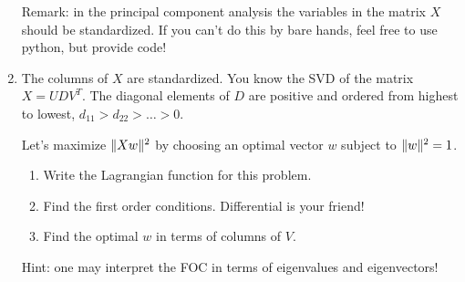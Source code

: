 \documentclass[12pt]{article}
\DeclarePairedDelimiter{\norm}{\lVert}{\rVert}
\begin{document}
\begin{enumerate}
    Remark: in the principal component analysis the variables in the matrix $X$ should be standardized.
    If you can't do this by bare hands, feel free to use python, but provide code!

    \item The columns of $X$ are standardized. 
    You know the SVD of the matrix $X = UDV^T$. 
    The diagonal elements of $D$ are positive and ordered from highest to lowest, $d_{11} > d_{22} > \dots > 0$.
    
    Let's maximize $\norm{Xw}^2$ by choosing an optimal vector $w$ subject to $\norm{w}^2 = 1$.
    
    \begin{enumerate}[resume]
        \item Write the Lagrangian function for this problem. 
        \item Find the first order conditions. Differential is your friend!
        \item Find the optimal $w$ in terms of columns of $V$. 
    \end{enumerate}

    Hint: one may interpret the FOC in terms of eigenvalues and eigenvectors!

\end{enumerate}
\end{document}
